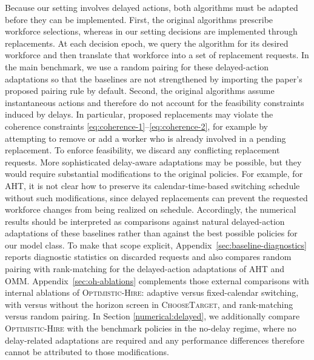 \documentclass[opre,blindrev]{informs3}
\newcommand{\ChooseTarget}{\textsc{ChooseTarget}}
\begin{document}
Because our setting involves delayed actions, both algorithms must be adapted before they can be implemented. First, the original algorithms prescribe workforce selections, whereas in our setting decisions are implemented through replacements. At each decision epoch, we query the algorithm for its desired workforce and then translate that workforce into a set of replacement requests. In the main benchmark, we use a random pairing for these delayed-action adaptations so that the baselines are not strengthened by importing the paper's proposed pairing rule by default. Second, the original algorithms assume instantaneous actions and therefore do not account for the feasibility constraints induced by delays. In particular, proposed replacements may violate the coherence constraints \eqref{eq:coherence-1}--\eqref{eq:coherence-2}, for example by attempting to remove or add a worker who is already involved in a pending replacement. To enforce feasibility, we discard any conflicting replacement requests. More sophisticated delay-aware adaptations may be possible, but they would require substantial modifications to the original policies. For example, for \textsc{AHT}, it is not clear how to preserve its calendar-time-based switching schedule without such modifications, since delayed replacements can prevent the requested workforce changes from being realized on schedule. Accordingly, the numerical results should be interpreted as comparisons against natural delayed-action adaptations of these baselines rather than against the best possible policies for our model class. To make that scope explicit, Appendix~\ref{sec:baseline-diagnostics} reports diagnostic statistics on discarded requests and also compares random pairing with rank-matching for the delayed-action adaptations of \textsc{AHT} and \textsc{OMM}. Appendix~\ref{sec:oh-ablations} complements those external comparisons with internal ablations of \textsc{Optimistic-Hire}: adaptive versus fixed-calendar switching, with versus without the horizon screen in \ChooseTarget, and rank-matching versus random pairing. In Section \ref{numerical:delayed}, we additionally compare \textsc{Optimistic-Hire} with the benchmark policies in the no-delay regime, where no delay-related adaptations are required and any performance differences therefore cannot be attributed to those modifications.
\end{document}
